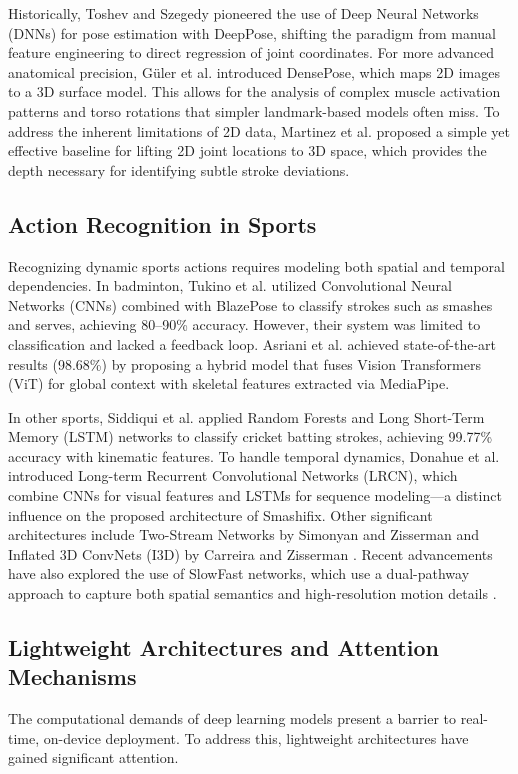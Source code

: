\documentclass[pdflatex,sn-mathphys-num]{sn-jnl}%
\theoremstyle{thmstyleone}%
\theoremstyle{thmstyletwo}%
\theoremstyle{thmstylethree}%
\begin{document}
Historically, Toshev and Szegedy \cite{b14} pioneered the use of Deep Neural Networks (DNNs) for pose estimation with DeepPose, shifting the paradigm from manual feature engineering to direct regression of joint coordinates. For more advanced anatomical precision, G\"uler et al. \cite{b15} introduced DensePose, which maps 2D images to a 3D surface model. This allows for the analysis of complex muscle activation patterns and torso rotations that simpler landmark-based models often miss. To address the inherent limitations of 2D data, Martinez et al. \cite{b16} proposed a simple yet effective baseline for lifting 2D joint locations to 3D space, which provides the depth necessary for identifying subtle stroke deviations.

\subsection{Action Recognition in Sports}
Recognizing dynamic sports actions requires modeling both spatial and temporal dependencies. In badminton, Tukino et al. \cite{b17} utilized Convolutional Neural Networks (CNNs) combined with BlazePose to classify strokes such as smashes and serves, achieving 80--90\% accuracy. However, their system was limited to classification and lacked a feedback loop. Asriani et al. \cite{b18} achieved state-of-the-art results (98.68\%) by proposing a hybrid model that fuses Vision Transformers (ViT) for global context with skeletal features extracted via MediaPipe.

In other sports, Siddiqui et al. \cite{b19} applied Random Forests and Long Short-Term Memory (LSTM) networks to classify cricket batting strokes, achieving 99.77\% accuracy with kinematic features. To handle temporal dynamics, Donahue et al. \cite{b20} introduced Long-term Recurrent Convolutional Networks (LRCN), which combine CNNs for visual features and LSTMs for sequence modeling---a distinct influence on the proposed architecture of Smashifix. Other significant architectures include Two-Stream Networks by Simonyan and Zisserman \cite{b21} and Inflated 3D ConvNets (I3D) by Carreira and Zisserman \cite{b22}. Recent advancements have also explored the use of SlowFast networks, which use a dual-pathway approach to capture both spatial semantics and high-resolution motion details \cite{b23}.

\subsection{Lightweight Architectures and Attention Mechanisms}
The computational demands of deep learning models present a barrier to real-time, on-device deployment. To address this, lightweight architectures have gained significant attention.
\end{document}
